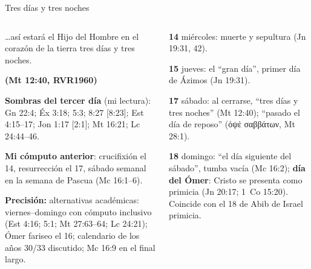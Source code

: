 \documentclass[hyperref={bookmarks=false},aspectratio=169]{beamer}
\newcommand{\grc}[1]{\foreignlanguage{ancientgreek}{#1}}
\newcommand{\fuente}[1]{\par\hfill{\upshape\bfseries\footnotesize\textcolor{tierraroja}{#1}}}
\newcommand{\destacar}[1]{\textbf{\textcolor{tierraroja}{#1}}}
\newcommand{\precision}[1]{{\footnotesize\color{sepia}\textbf{Precisión:} #1}}
\begin{document}
\begin{frame}{Tres días y tres noches}
\begin{columns}[t,onlytextwidth]
\begin{column}{0.50\textwidth}
\begin{cita}\ldots{}así estará el Hijo del Hombre en el corazón de la tierra tres días y tres noches.\fuente{(Mt 12:40, RVR1960)}\end{cita}
\scriptsize\RaggedRight \textbf{Sombras del tercer día} (mi lectura): Gn 22:4; Éx 3:18; 5:3; 8:27 [8:23]; Est 4:15--17; Jon 1:17 [2:1]; Mt 16:21; Lc 24:44--46.\par\smallskip
\textbf{Mi cómputo anterior}: crucifixión el 14, resurrección el 17, sábado semanal en la semana de Pascua (Mc 16:1--6).\par\smallskip
\precision{alternativas académicas: viernes--domingo con cómputo inclusivo (Est 4:16; 5:1; Mt 27:63--64; Lc 24:21); Ómer fariseo el 16; calendario de los años 30/33 discutido; Mc 16:9 en el final largo.}
\end{column}
\begin{column}{0.48\textwidth}\scriptsize\RaggedRight
\begin{tcolorbox}[colback=papiro,colframe=tierraroja,boxrule=1pt,arc=3pt,title={\scriptsize\bfseries Lectura de la serie},coltitle=papiro,colbacktitle=tierraroja,fontupper=\scriptsize,left=3pt,right=3pt,top=2pt,bottom=2pt]
\RaggedRight
\textbf{14} miércoles: muerte y sepultura (Jn 19:31, 42).\par
\textbf{15} jueves: el ``gran día'', primer día de Ázimos (Jn 19:31).\par
\textbf{17} sábado: al cerrarse, ``tres días y tres noches'' (Mt 12:40); ``pasado el día de reposo'' (\grc{ὀψὲ σαββάτων}, Mt 28:1).\par
\textbf{18} domingo: ``el día siguiente del sábado'', tumba vacía (Mc 16:2); \destacar{día del Ómer}: Cristo se presenta como primicia (Jn 20:17; 1~Co 15:20). Coincide con el 18 de Abib de Israel primicia.
\end{tcolorbox}
\end{column}
\end{columns}
\end{frame}
\end{document}
